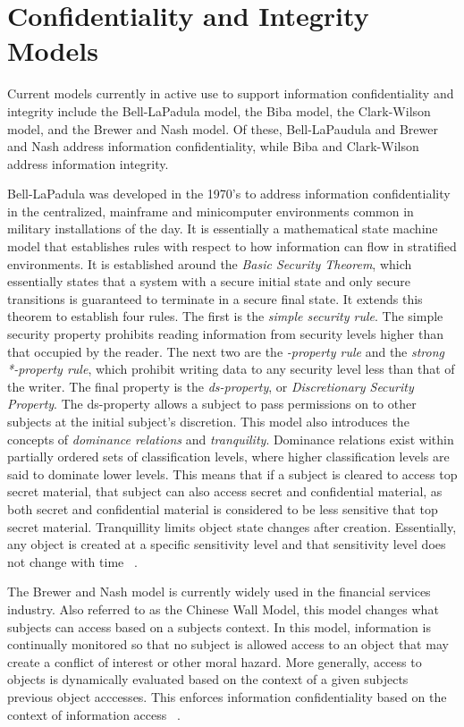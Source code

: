 \section{Confidentiality and Integrity Models}
Current models currently in active use to support information confidentiality and integrity include the Bell-LaPadula model, the Biba model,  the Clark-Wilson model, and the Brewer and Nash model.  Of these, Bell-LaPaudula and Brewer and Nash address information confidentiality, while Biba and Clark-Wilson address information integrity.

Bell-LaPadula was developed in the 1970's to address information confidentiality in the centralized, mainframe and minicomputer environments  common in military installations of the day.  It is essentially a mathematical state machine model that establishes rules with respect to how information can flow in stratified environments.  It is established around the {\it Basic Security Theorem}, which essentially states that a system with a secure initial state and only secure transitions is guaranteed to terminate in a secure final state.  It extends this theorem to establish four rules.  The first is the {\it simple security rule}.  The simple security property prohibits reading information from security levels higher than that occupied by the reader.  The next two are the {\it *-property rule} and the {\it strong *-property rule}, which prohibit writing data to any security level less than that of the writer.  The final property is the {\it ds-property}, or {\it Discretionary Security Property}.  The ds-property allows a subject to pass permissions on to other subjects at the initial subject's discretion.  This model also introduces the concepts of {\it dominance relations} and {\it tranquility}.  Dominance relations exist within partially ordered sets of classification levels, where higher classification levels are said to dominate lower levels.  This means that if a subject is cleared to access top secret material, that subject can also access secret and confidential material, as both secret and confidential material is considered to be less sensitive that top secret material.  Tranquillity limits object state changes after creation.  Essentially, any object is created at a specific sensitivity level and that sensitivity level does not change with time ~\cite{Bell1973}.

The Brewer and Nash model is currently widely used in the financial services industry.  Also referred to as the Chinese Wall Model, this model changes what subjects can access based on a subjects context.  In this model, information is continually monitored so that no subject is allowed access to an object that may create a conflict of interest or other moral hazard.  More generally, access to objects is dynamically evaluated based on the context of a given subjects previous object acccesses. This enforces information confidentiality based on the context of information access ~\cite{Brewer89}.

